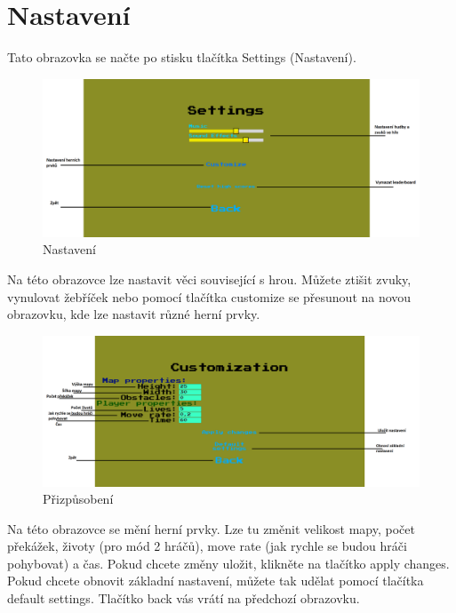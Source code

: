 \documentclass[12pt,a4paper]{report}
\begin{document}
\chapter{Nastavení}
Tato obrazovka se načte po stisku tlačítka Settings (Nastavení).
\begin{figure}[H]
    \centering
    \includegraphics[width=\textwidth]{images/settings_desc.png}
    \caption{Nastavení}
\end{figure}
Na této obrazovce lze nastavit věci související s hrou.
Můžete ztišit zvuky, vynulovat žebříček nebo pomocí tlačítka customize se přesunout na novou obrazovku, kde lze nastavit různé herní prvky.
\newpage
\begin{figure}[H]
    \centering
    \includegraphics[width=\textwidth]{images/customization_desc.png}
    \caption{Přizpůsobení}
\end{figure}
Na této obrazovce se mění herní prvky. Lze tu změnit velikost mapy, počet překážek, životy (pro mód 2 hráčů), move rate (jak rychle se budou hráči pohybovat) a čas.
Pokud chcete změny uložit, klikněte na tlačítko apply changes.
Pokud chcete obnovit základní nastavení, můžete tak udělat pomocí tlačítka default settings.
Tlačítko back vás vrátí na předchozí obrazovku.
\end{document}
